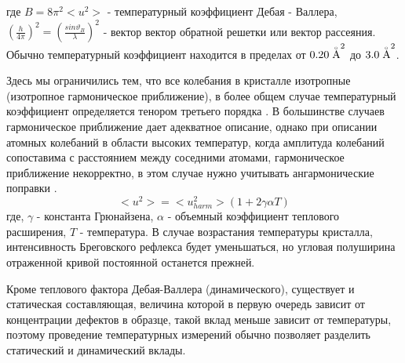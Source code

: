  где $B = 8 \pi^2 <u^2>$ - температурный коэффициент Дебая - Валлера,
 $(\frac{h}{4\pi})^2=(\frac{sin\vartheta_B}{\lambda})^2$ -
 вектор вектор обратной решетки или вектор рассеяния. Обычно температурный коэффициент
 находится в пределах от $0.20 \angstrom ^2$ до $3.0 \angstrom ^2$.

 Здесь мы ограничились тем, что все колебания в кристалле изотропные
 (изотропное гармоническое приближение), в более общем случае
 температурный коэффициент определяется тенором третьего порядка \cite{Willis1975}.
 В большинстве случаев гармоническое приближение дает адекватное описание, однако при описании
 атомных колебаний в области высоких температур, когда амплитуда колебаний сопоставима с расстоянием
 между соседними атомами, гармоническое приближение некорректно, в этом случае нужно учитывать ангармонические
 поправки \cite{kibalin2015}.
 \begin{equation}
   <u^2> = <u^2_{harm}> (1+2\gamma \alpha T)
  \end{equation}
  где, $\gamma$ - константа Грюнайзена, $\alpha$ - объемный коэффициент теплового расширения, $T$ - температура.
  В случае возрастания температуры кристалла, интенсивность Бреговского рефлекса будет уменьшаться,
  но угловая полуширина отраженной кривой постоянной останется прежней.

 Кроме теплового фактора Дебая-Валлера (динамического), существует и статическая составляющая,
 величина которой в первую очередь зависит от концентрации дефектов в образце,
 такой вклад меньше зависит от температуры, поэтому проведение температурных измерений
 обычно позволяет разделить статический и динамический вклады.


%

%
